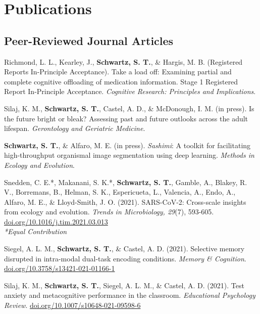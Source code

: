 \section*{Publications}
\subsection*{Peer-Reviewed Journal Articles}
Richmond, L. L., Kearley, J., \textbf{Schwartz, S. T.}, \& Hargis, M. B. (Registered Reports In-Principle Acceptance). Take a load off: Examining partial and complete cognitive offloading of medication information. Stage 1 Registered Report In-Principle Acceptance. \textit{Cognitive Research: Principles and Implications}.

\pubspace

Silaj, K. M., \textbf{Schwartz, S. T.}, Castel, A. D., \& McDonough, I. M. (in press). Is the future bright or bleak? Assessing past and future outlooks across the adult lifespan. \textit{Gerontology and Geriatric Medicine}.

\pubspace

\textbf{Schwartz, S. T.}, \& Alfaro, M. E. (in press). \textit{Sashimi}: A toolkit for facilitating high-throughput organismal image segmentation using deep learning. \textit{Methods in Ecology and Evolution}.

\pubspace

Snedden, C. E.*, Makanani, S. K.*, \textbf{Schwartz, S. T.}, Gamble, A., Blakey, R. V., Borremans, B., Helman, S. K., Espericueta, L., Valencia, A., Endo, A., Alfaro, M. E., \& Lloyd-Smith, J. O. (2021). SARS-CoV-2: Cross-scale insights from ecology and evolution. \textit{Trends in Microbiology, 29}(7), 593-605.\\
\textcolor{RoyalBlue}{\href{https://doi.org/10.1016/j.tim.2021.03.013}{doi.org/10.1016/j.tim.2021.03.013}}
\\ \textit{*Equal Contribution}

\newpage

Siegel, A. L. M., \textbf{Schwartz, S. T.}, \& Castel, A. D. (2021). Selective memory disrupted in intra-modal dual-task encoding conditions. \textit{Memory \& Cognition}. \textcolor{RoyalBlue}{\href{https://doi.org/10.3758/s13421-021-01166-1}{doi.org/10.3758/s13421-021-01166-1}}

\pubspace

Silaj, K. M., \textbf{Schwartz, S. T.}, Siegel, A. L. M., \& Castel, A. D. (2021). Test anxiety and metacognitive performance in the classroom. \textit{Educational Psychology Review}. \textcolor{RoyalBlue}{\href{https://doi.org/10.1007/s10648-021-09598-6}{doi.org/10.1007/s10648-021-09598-6}}

